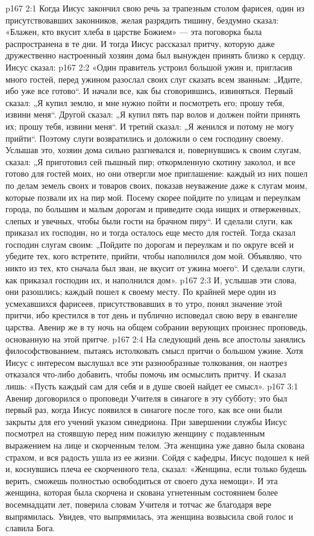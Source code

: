 \vs p167 2:1 Когда Иисус закончил свою речь за трапезным столом фарисея, один из присутствовавших законников, желая разрядить тишину, бездумно сказал: «Блажен, кто вкусит хлеба в царстве Божием» --- эта поговорка была распространена в те дни. И тогда Иисус рассказал притчу, которую даже дружественно настроенный хозяин дома был вынужден принять близко к сердцу. Иисус сказал:
\vs p167 2:2 «Один правитель устроил большой ужин и, пригласив много гостей, перед ужином разослал своих слуг сказать всем званным: „Идите, ибо уже все готово“. И начали все, как бы сговорившись, извиняться. Первый сказал: „Я купил землю, и мне нужно пойти и посмотреть его; прошу тебя, извини меня“. Другой сказал: „Я купил пять пар волов и должен пойти принять их; прошу тебя, извини меня“. И третий сказал: „Я женился и потому не могу прийти“. Поэтому слуги возвратились и доложили о сем господину своему. Услышав это, хозяин дома сильно разгневался и, повернувшись к своим слугам, сказал: „Я приготовил сей пышный пир; откормленную скотину заколол, и все готово для гостей моих, но они отвергли мое приглашение: каждый из них пошел по делам земель своих и товаров своих, показав неуважение даже к слугам моим, которые позвали их на пир мой. Посему скорее пойдите по улицам и переулкам города, по большим и малым дорогам и приведите сюда нищих и отверженных, слепых и увечных, чтобы были гости на брачном пиру“. И сделали слуги, как приказал их господин, но и тогда осталось еще место для гостей. Тогда сказал господин слугам своим: „Пойдите по дорогам и переулкам и по округе всей и убедите тех, кого встретите, прийти, чтобы наполнился дом мой. Объявляю, что никто из тех, кто сначала был зван, не вкусит от ужина моего“. И сделали слуги, как приказал господин их, и наполнился дом».
\vs p167 2:3 \pc И, услышав эти слова, они разошлись; каждый пошел к своему месту. По крайней мере один из усмехавшихся фарисеев, присутствовавших в то утро, понял значение этой притчи, ибо крестился в тот день и публично исповедал свою веру в евангелие царства. Авенир же в ту ночь на общем собрании верующих произнес проповедь, основанную на этой притче.
\vs p167 2:4 На следующий день все апостолы занялись философствованием, пытаясь истолковать смысл притчи о большом ужине. Хотя Иисус с интересом выслушал все эти разнообразные толкования, он наотрез отказался что\hyp{}либо добавить, чтобы помочь им осмыслить притчу. И сказал лишь: «Пусть каждый сам для себя и в душе своей найдет ее смысл».
\vs p167 3:1 Авенир договорился о проповеди Учителя в синагоге в эту субботу; это был первый раз, когда Иисус появился в синагоге после того, как все они были закрыты для его учений указом синедриона. При завершении службы Иисус посмотрел на стоявшую перед ним пожилую женщину с подавленным выражением на лице и скорченным телом. Эта женщина уже давно была скована страхом, и вся радость ушла из ее жизни. Сойдя с кафедры, Иисус подошел к ней и, коснувшись плеча ее скорченного тела, сказал: «Женщина, если только будешь верить, сможешь полностью освободиться от своего духа немощи». И эта женщина, которая была скорчена и скована угнетенным состоянием более восемнадцати лет, поверила словам Учителя и тотчас же благодаря вере выпрямилась. Увидев, что выпрямилась, эта женщина возвысила свой голос и славила Бога.
